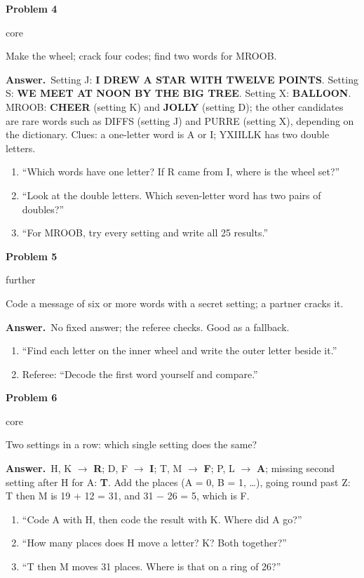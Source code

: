 \documentclass[11pt]{article}
\newcommand{\lbl}[1]{\colorbox{black!10}{\footnotesize\strut #1}}
\newcommand{\core}{\lbl{core}}
\newcommand{\further}{\lbl{further}}
\newcommand{\pb}[3]{\par\needspace{4\baselineskip}\vspace{3pt}\noindent\textbf{Problem #1}\enspace #2\enspace #3\par}
\newcommand{\ans}{\textbf{Answer.}\ }
\newenvironment{hints}{\begin{enumerate}[label={\textit{Hint \arabic*.}}, leftmargin=*, align=left]}{\end{enumerate}}
\begin{document}
\pb{4}{\core}{Make the wheel; crack four codes; find two words for MROOB.}
\ans Setting J: \textbf{I DREW A STAR WITH TWELVE POINTS}. Setting S: \textbf{WE MEET AT NOON BY THE BIG TREE}.
Setting X: \textbf{BALLOON}. MROOB: \textbf{CHEER} (setting K) and \textbf{JOLLY} (setting D); the other
candidates are rare words such as DIFFS (setting J) and PURRE (setting X), depending on the dictionary. Clues: a one-letter word is A or I; YXIILLK has two double letters.
\begin{hints}
\item ``Which words have one letter? If R came from I, where is the wheel set?''
\item ``Look at the double letters. Which seven-letter word has two pairs of doubles?''
\item ``For MROOB, try every setting and write all 25 results.''
\end{hints}

\pb{5}{\further}{Code a message of six or more words with a secret setting; a partner cracks it.}
\ans No fixed answer; the referee checks. Good as a fallback.
\begin{hints}
\item ``Find each letter on the inner wheel and write the outer letter beside it.''
\item Referee: ``Decode the first word yourself and compare.''
\end{hints}

\pb{6}{\core}{Two settings in a row: which single setting does the same?}
\ans H, K $\to$ \textbf{R}; D, F $\to$ \textbf{I}; T, M $\to$ \textbf{F}; P, L $\to$ \textbf{A}; missing second
setting after H for A: \textbf{T}. Add the places (A = 0, B = 1, \dots), going round past Z: T then M is
19 + 12 = 31, and 31 $-$ 26 = 5, which is F.
\begin{hints}
\item ``Code A with H, then code the result with K. Where did A go?''
\item ``How many places does H move a letter? K? Both together?''
\item ``T then M moves 31 places. Where is that on a ring of 26?''
\end{hints}
\end{document}
